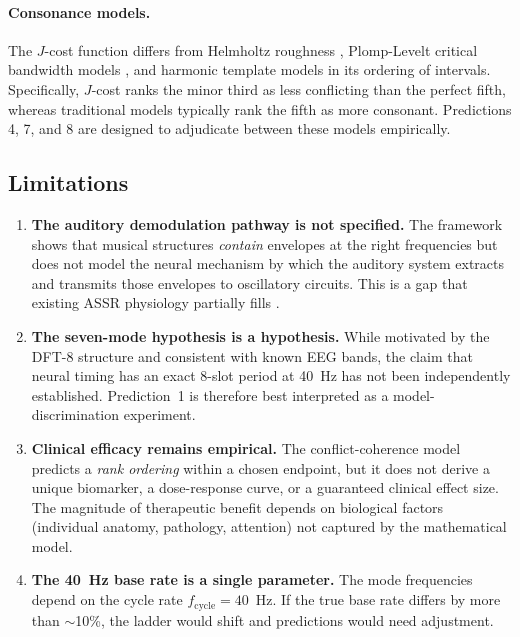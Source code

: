 \documentclass[11pt,a4paper]{article}
\begin{document}
\paragraph{Consonance models.}
The $J$-cost function differs from Helmholtz roughness
\citep{helmholtz1863}, Plomp-Levelt critical bandwidth models
\citep{plomp1965}, and harmonic template models
\citep{parncutt2011} in its ordering of intervals. Specifically,
$J$-cost ranks the minor third as less conflicting than the perfect
fifth, whereas traditional models typically rank the fifth as more
consonant. Predictions 4, 7, and 8 are designed to adjudicate between
these models empirically.

\subsection{Limitations}

\begin{enumerate}
  \item \textbf{The auditory demodulation pathway is not specified.}
    The framework shows that musical structures \emph{contain}
    envelopes at the right frequencies but does not model the neural
    mechanism by which the auditory system extracts and transmits those
    envelopes to oscillatory circuits. This is a gap that existing ASSR
    physiology partially fills \citep{picton2003}.

  \item \textbf{The seven-mode hypothesis is a hypothesis.}
    While motivated by the DFT-8 structure and consistent with known
    EEG bands, the claim that neural timing has an exact 8-slot period
    at 40~Hz has not been independently established. Prediction~1 is
    therefore best interpreted as a model-discrimination experiment.

  \item \textbf{Clinical efficacy remains empirical.}
    The conflict-coherence model predicts a \emph{rank ordering} within
    a chosen endpoint, but it does not derive a unique biomarker, a
    dose-response curve, or a guaranteed clinical effect size. The
    magnitude of therapeutic benefit depends on biological factors
    (individual anatomy, pathology, attention) not captured by the
    mathematical model.

  \item \textbf{The 40~Hz base rate is a single parameter.}
    The mode frequencies depend on the cycle rate
    $f_{\mathrm{cycle}}=40$~Hz. If the true base rate differs by more
    than $\sim$10\%, the ladder would shift and predictions would need
    adjustment.
\end{enumerate}
\end{document}
